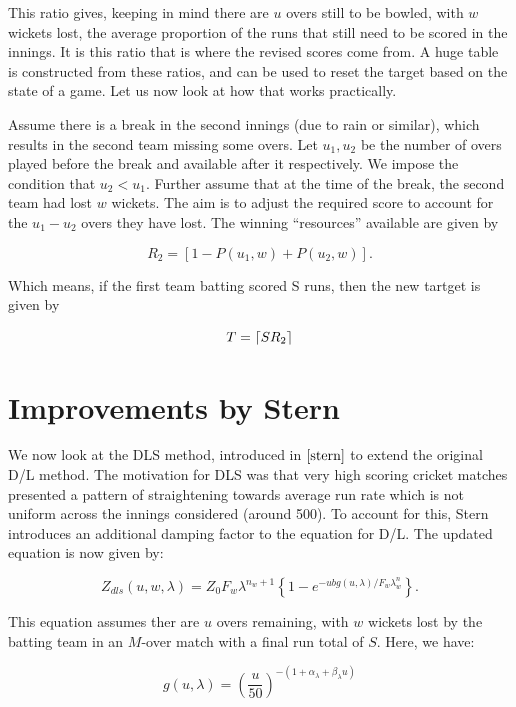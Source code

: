 This ratio gives, keeping in mind there are $u$ overs still to be bowled, with $w$ wickets
lost, the average proportion of the runs that still need to be scored in the innings. 
It is this ratio that is where the revised scores come from. A huge table is constructed from these 
ratios, and can be used to reset the target based on the state of a game. Let us now look at how that works
practically.

\begin{example}
    \label{dlExMain}
    Assume there is a break in the second innings (due to rain or similar), which results in the second team missing some overs.
    Let $u_1, u_2$ be the number of overs played before the break and available after it respectively. We impose the condition
    that $u_2 < u_1$. Further assume that at the time of the break, the second team had lost $w$ wickets. The aim is to adjust the required score to account
    for the $u_1 - u_2$ overs they have lost. The winning ``resources'' available are given by

    \[
        R_2 = [1-P(u_1,w)+P(u_2,w)].
    \]  

    Which means, if the first team batting scored S runs, then the new tartget is given by

    \[
        T = \lceil SR_2\rceil
    \]  
\end{example}

\section{Improvements by Stern}
We now look at the DLS method, introduced in $\cite{stern}$ to extend the original D/L method. The motivation for DLS was that very high scoring
cricket matches presented a pattern of straightening towards average run rate which is not uniform across the innings considered (around 500). To account for 
this, Stern introduces an additional damping factor to the equation for D/L. The updated equation is now given by:

\begin{equation}
    \label{dls}
    Z_{dls}(u,w,\lambda) = Z_0F_w\lambda^{n_w+1} \left\{ 1-e^{-ubg(u,\lambda)/F_w\lambda^n_w} \right\}.
\end{equation}

This equation assumes ther are $u$ overs remaining, with $w$ wickets lost by the batting team in an $M$-over match with a final run total of $S$. Here, we have:

\begin{equation}
    \label{gfunc}
    g(u,\lambda) = \left (\frac{u}{50} \right)^{-(1+\alpha_\lambda+\beta_\lambda u)}
\end{equation}

